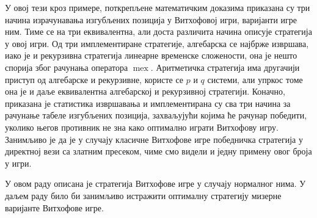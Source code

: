 \documentclass[a4paper]{article}
\DeclareMathOperator{\mex}{mex}
\begin{document}
У овој тези кроз примере, поткрепљене математичким доказима приказана су три начина израчунавања изгубљених позиција у Витхофовој игри, варијанти игре ним. Тиме се на три еквивалентна, али доста различита начина описује  стратегија у овој игри. Од три имплементиране стратегије, алгебарска се најбрже извршава, иако је и рекурзивна стратегија линеарне временске сложености, она је нешто спорија због рачунања оператора $ \mex $. Аритметичка стратегија има другачији приступ од алгебарске и рекурзивне, користе се $ p $ и $ q $ системи, али упркос томе она је и даље еквивалентна алгебарској и рекурзивној стратегији. Коначно, приказана је статистика извршавања и имплементирана су сва три начина за рачунање табеле изгубљених позиција,  захваљујући којима ће рачунар победити, уколико његов противник не зна како оптимално играти Витхофову игру.  
Занимљиво је да је у случају класичне Витхофове игре победничка стратегија у директној вези са златним пресеком, чиме смо видели и једну примену овог броја у игри.

У овом раду описана је стратегија Витхофове игре у случају нормалног нима. У даљем раду било би занимљиво истражити оптималну стратегију мизерне варијанте Витхофове игре. 

%
\newpage
{}
\appendix
 

\end{document}
